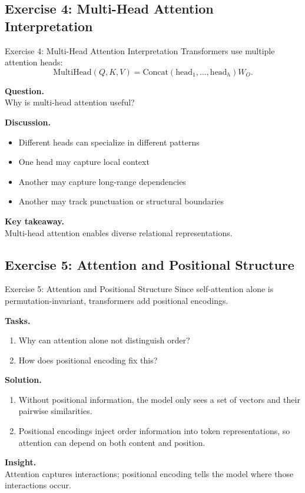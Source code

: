 \documentclass[aspectratio=169,11pt]{beamer}
\begin{document}
\subsection{Exercise 4: Multi-Head Attention Interpretation}
\begin{frame}[t,allowframebreaks]{Exercise 4: Multi-Head Attention Interpretation}
\small
Transformers use multiple attention heads:
\[
\text{MultiHead}(Q,K,V) = \text{Concat}(\text{head}_1, \dots, \text{head}_h)W_O.
\]

\textbf{Question.}\\ Why is multi-head attention useful?

\textbf{Discussion.}\\ \begin{itemize}
    \item Different heads can specialize in different patterns
    \item One head may capture local context
    \item Another may capture long-range dependencies
    \item Another may track punctuation or structural boundaries
\end{itemize}

\textbf{Key takeaway.}\\ Multi-head attention enables diverse relational representations.
\end{frame}

\subsection{Exercise 5: Attention and Positional Structure}
\begin{frame}[t,allowframebreaks]{Exercise 5: Attention and Positional Structure}
\small
Since self-attention alone is permutation-invariant, transformers add positional encodings.

\textbf{Tasks.}\\ \begin{enumerate}
    \item Why can attention alone not distinguish order?
    \item How does positional encoding fix this?
\end{enumerate}

\textbf{Solution.}\\ \begin{enumerate}
    \item Without positional information, the model only sees a set of vectors and their pairwise similarities.

    \item Positional encodings inject order information into token representations, so attention can depend on both content and position.
\end{enumerate}

\textbf{Insight.}\\ Attention captures interactions; positional encoding tells the model where those interactions occur.
\end{frame}
\end{document}
